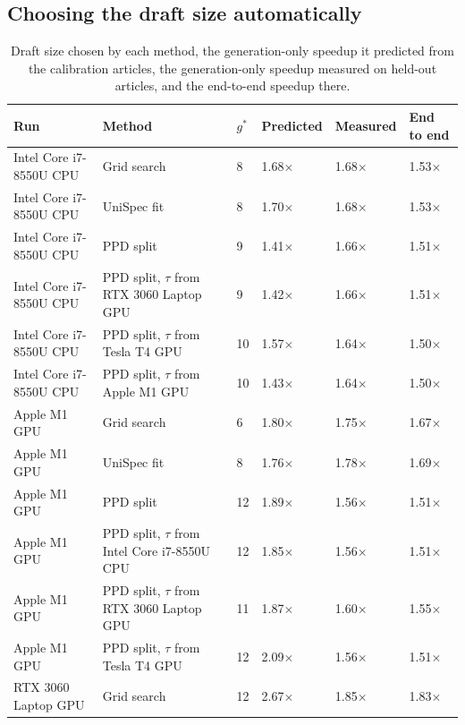 \documentclass[11pt,a4paper]{article}
\begin{document}
\subsection{Choosing the draft size automatically}
\begin{table}[tbp]
\centering
\small
\caption{Draft size chosen by each method, the generation-only speedup it predicted from the calibration articles, the generation-only speedup measured on held-out articles, and the end-to-end speedup there.}
\setlength{\tabcolsep}{4pt}
\begin{tabular}{L{3.29cm}L{5.13cm}L{0.92cm}L{1.65cm}L{1.65cm}L{1.83cm}}
\toprule
\textbf{Run} & \textbf{Method} & \textbf{$g^*$} & \textbf{Predicted} & \textbf{Measured} & \textbf{End to end} \\
\midrule
Intel Core i7-8550U CPU & Grid search & 8 & 1.68$\times$ & 1.68$\times$ & 1.53$\times$ \\
Intel Core i7-8550U CPU & UniSpec fit & 8 & 1.70$\times$ & 1.68$\times$ & 1.53$\times$ \\
Intel Core i7-8550U CPU & PPD split & 9 & 1.41$\times$ & 1.66$\times$ & 1.51$\times$ \\
Intel Core i7-8550U CPU & PPD split, $\tau$ from RTX 3060 Laptop GPU & 9 & 1.42$\times$ & 1.66$\times$ & 1.51$\times$ \\
Intel Core i7-8550U CPU & PPD split, $\tau$ from Tesla T4 GPU & 10 & 1.57$\times$ & 1.64$\times$ & 1.50$\times$ \\
Intel Core i7-8550U CPU & PPD split, $\tau$ from Apple M1 GPU & 10 & 1.43$\times$ & 1.64$\times$ & 1.50$\times$ \\
Apple M1 GPU & Grid search & 6 & 1.80$\times$ & 1.75$\times$ & 1.67$\times$ \\
Apple M1 GPU & UniSpec fit & 8 & 1.76$\times$ & 1.78$\times$ & 1.69$\times$ \\
Apple M1 GPU & PPD split & 12 & 1.89$\times$ & 1.56$\times$ & 1.51$\times$ \\
Apple M1 GPU & PPD split, $\tau$ from Intel Core i7-8550U CPU & 12 & 1.85$\times$ & 1.56$\times$ & 1.51$\times$ \\
Apple M1 GPU & PPD split, $\tau$ from RTX 3060 Laptop GPU & 11 & 1.87$\times$ & 1.60$\times$ & 1.55$\times$ \\
Apple M1 GPU & PPD split, $\tau$ from Tesla T4 GPU & 12 & 2.09$\times$ & 1.56$\times$ & 1.51$\times$ \\
RTX 3060 Laptop GPU & Grid search & 12 & 2.67$\times$ & 1.85$\times$ & 1.83$\times$ \\

\end{tabular}
\end{table}
\end{document}
